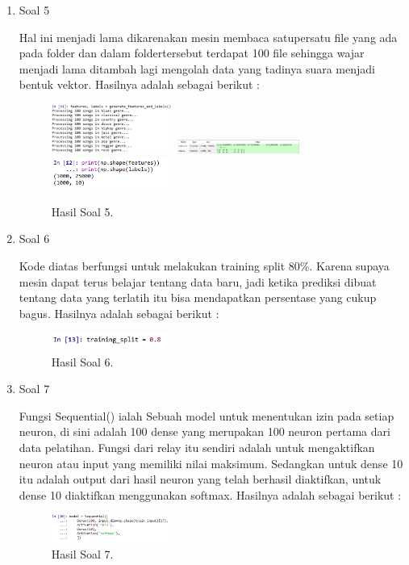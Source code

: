 \begin{enumerate}
	\item Soal 5
	\hfill\break
	
	Hal ini menjadi lama dikarenakan mesin membaca satupersatu file yang ada pada folder dan dalam foldertersebut terdapat 100 file sehingga wajar menjadi lama ditambah lagi mengolah data yang tadinya suara menjadi bentuk vektor. Hasilnya adalah sebagai berikut :
	\begin{figure}[H]
	\centering
		\includegraphics[width=4cm]{figures/1174087/6/12.png}
		\includegraphics[width=4cm]{figures/1174087/6/13.png}
		\includegraphics[width=4cm]{figures/1174087/6/14.png}
		\caption{Hasil Soal 5.}
	\end{figure}

	\item Soal 6
	\hfill\break
	
	Kode diatas berfungsi untuk melakukan training split 80\%. Karena supaya mesin dapat terus belajar tentang data baru, jadi ketika prediksi dibuat tentang data yang terlatih itu bisa mendapatkan persentase yang cukup bagus. Hasilnya adalah sebagai berikut :
	\begin{figure}[H]
	\centering
		\includegraphics[width=4cm]{figures/1174087/6/15.png}
		\caption{Hasil Soal 6.}
	\end{figure}

	\item Soal 7
	\hfill\break
	
	Fungsi Sequential() ialah Sebuah model untuk menentukan izin pada setiap neuron, di sini adalah 100 dense yang merupakan 100 neuron pertama dari data pelatihan. Fungsi dari relay itu sendiri adalah untuk mengaktifkan neuron atau input yang memiliki nilai maksimum. Sedangkan untuk dense 10 itu adalah output dari hasil neuron yang telah berhasil diaktifkan, untuk dense 10 diaktifkan menggunakan softmax. Hasilnya adalah sebagai berikut :
	\begin{figure}[H]
	\centering
		\includegraphics[width=4cm]{figures/1174087/6/16.png}
		\caption{Hasil Soal 7.}
	\end{figure}


\end{enumerate}
